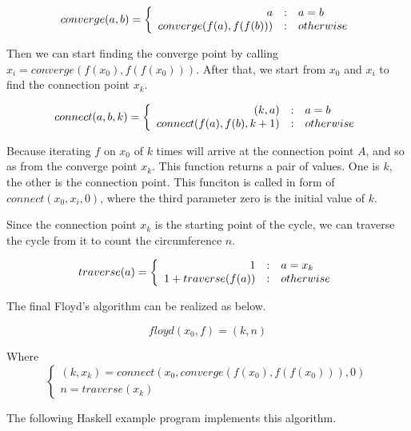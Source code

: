 \documentclass{article}
\begin{document}
\begin{equation}
converge(a, b) = \left \{
  \begin{array}
  {r@{\quad:\quad}l}
  a & a = b \\
  converge(f(a), f(f(b))) & otherwise
  \end{array}
\right.
\end{equation}

Then we can start finding the converge point by calling $x_i = converge(f(x_0), f(f(x_0)))$.
After that, we start from $x_0$ and $x_i$ to find the connection point $x_k$.

\begin{equation}
connect(a, b, k) = \left \{
  \begin{array}
  {r@{\quad:\quad}l}
  (k, a) & a = b \\
  connect(f(a), f(b), k + 1) & otherwise
  \end{array}
\right.
\end{equation}

Because iterating $f$ on $x_0$ of $k$ times will arrive at the connection point $A$, and so as
from the converge point $x_k$. This function returns a pair of values. One is $k$, the other is
the connection point. This funciton is called in form of $connect(x_0, x_i, 0)$, where the third
parameter zero is the initial value of $k$.

Since the connection point $x_k$ is the starting point of the cycle, we can traverse the cycle
from it to count the circumference $n$.

\begin{equation}
traverse(a) =  \left \{
  \begin{array}
  {r@{\quad:\quad}l}
  1 & a = x_k \\
  1 + traverse(f(a)) & otherwise
  \end{array}
\right.
\end{equation}

The final Floyd's algorithm can be realized as below.

\begin{equation}
floyd(x_0, f) = (k, n)
\end{equation}

Where
\[
\left \{
\begin{array}{l}
(k, x_k) = connect(x_0, converge(f(x_0), f(f(x_0))), 0) \\
n = traverse(x_k)
\end{array}
\right .
\]

The following Haskell example program implements this algorithm.
\end{document}
